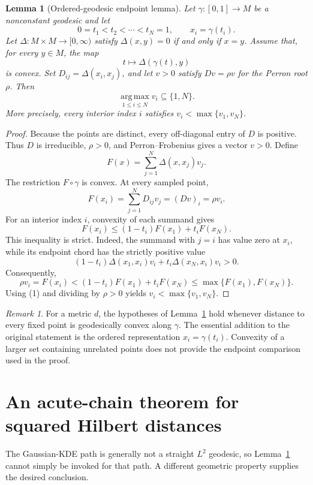 \documentclass[11pt,a4paper]{article}
\theoremstyle{clean}
\newtheorem{lemma}[definition]{Lemma}
\theoremstyle{remark}
\newtheorem{remark}[definition]{Remark}
\newcommand{\argmax}{\operatorname*{arg\,max}}
\begin{document}
\begin{lemma}[Ordered-geodesic endpoint lemma]\label{lem:geodesic}
Let $\gamma:[0,1]\to M$ be a nonconstant geodesic and let
\[
  0=t_1<t_2<\cdots<t_N=1,\qquad x_i=\gamma(t_i).
\]
Let $\Delta:M\times M\to[0,\infty)$ satisfy
$\Delta(x,y)=0$ if and only if $x=y$.  Assume that, for every $y\in M$, the map
\[
  t\longmapsto \Delta(\gamma(t),y)
\]
is convex.  Set $D_{ij}=\Delta(x_i,x_j)$, and let $v>0$ satisfy
$Dv=\rho v$ for the Perron root $\rho$.  Then
\[
  \argmax_{1\leq i\leq N}v_i\subseteq\{1,N\}.
\]
More precisely, every interior index $i$ satisfies
$v_i<\max\{v_1,v_N\}$.
\end{lemma}

\begin{proof}
Because the points are distinct, every off-diagonal entry of $D$ is positive.
Thus $D$ is irreducible, $\rho>0$, and Perron--Frobenius gives a vector $v>0$.
Define
\[
  F(x)=\sum_{j=1}^N \Delta(x,x_j)v_j.
\]
The restriction $F\circ\gamma$ is convex.  At every sampled point,
\[
  F(x_i)=\sum_{j=1}^N D_{ij}v_j=(Dv)_i=\rho v_i.      \tag{1}
\]
For an interior index $i$, convexity of each summand gives
\[
  F(x_i)\leq (1-t_i)F(x_1)+t_iF(x_N).
\]
This inequality is strict.  Indeed, the summand with $j=i$ has value zero at
$x_i$, while its endpoint chord has the strictly positive value
\[
  (1-t_i)\Delta(x_1,x_i)v_i+t_i\Delta(x_N,x_i)v_i>0.
\]
Consequently,
\[
  \rho v_i=F(x_i)
  <(1-t_i)F(x_1)+t_iF(x_N)
  \leq\max\{F(x_1),F(x_N)\}.
\]
Using (1) and dividing by $\rho>0$ yields
$v_i<\max\{v_1,v_N\}$.
\end{proof}

\begin{remark}
For a metric $d$, the hypotheses of Lemma~\ref{lem:geodesic} hold whenever
distance to every fixed point is geodesically convex along $\gamma$.  The
essential addition to the original statement is the ordered representation
$x_i=\gamma(t_i)$.  Convexity of a larger set containing unrelated points does
not provide the endpoint comparison used in the proof.
\end{remark}

\section{An acute-chain theorem for squared Hilbert distances}

The Gaussian-KDE path is generally not a straight $L^2$ geodesic, so
Lemma~\ref{lem:geodesic} cannot simply be invoked for that path.  A different
geometric property supplies the desired conclusion.
\end{document}
